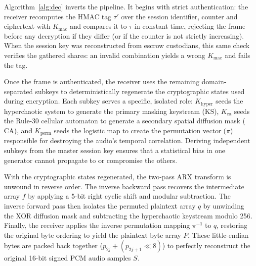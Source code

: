 \documentclass[pdflatex,sn-mathphys-num]{sn-jnl}%
\theoremstyle{thmstyleone}%
\theoremstyle{thmstyletwo}%
\theoremstyle{thmstylethree}%
\begin{document}
Algorithm~\ref{alg:dec} inverts the pipeline. It begins with strict authentication: the receiver recomputes the HMAC tag $\tau'$ over the session identifier, counter and ciphertext with $K_{\mathrm{mac}}$ and compares it to $\tau$ in constant time, rejecting the frame before any decryption if they differ (or if the counter is not strictly increasing). When the session key was reconstructed from escrow custodians, this same check verifies the gathered shares: an invalid combination yields a wrong $K_{\mathrm{mac}}$ and fails the tag.

Once the frame is authenticated, the receiver uses the remaining domain-separated subkeys to deterministically regenerate the cryptographic states used during encryption. Each subkey serves a specific, isolated role: $K_{\mathrm{hyper}}$ seeds the hyperchaotic system to generate the primary masking keystream ($\mathrm{KS}$), $K_{\mathrm{ca}}$ seeds the Rule-30 cellular automaton to generate a secondary spatial diffusion mask ($\mathrm{CA}$), and $K_{\mathrm{perm}}$ seeds the logistic map to create the permutation vector ($\pi$) responsible for destroying the audio's temporal correlation. Deriving independent subkeys from the master session key ensures that a statistical bias in one generator cannot propagate to or compromise the others.

With the cryptographic states regenerated, the two-pass ARX transform is unwound in reverse order. The inverse backward pass recovers the intermediate array $f$ by applying a 5-bit right cyclic shift and modular subtraction. The inverse forward pass then isolates the permuted plaintext array $q$ by unwinding the XOR diffusion mask and subtracting the hyperchaotic keystream modulo 256. Finally, the receiver applies the inverse permutation mapping $\pi^{-1}$ to $q$, restoring the original byte ordering to yield the plaintext byte array $P$. These little-endian bytes are packed back together ($p_{2j} + (p_{2j+1} \ll 8)$) to perfectly reconstruct the original 16-bit signed PCM audio samples $S$.
\end{document}
